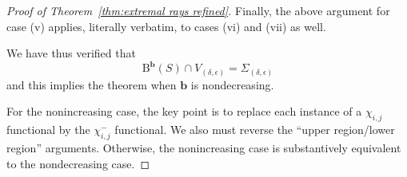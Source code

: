 \documentclass[12pt]{amsart}
\theoremstyle{definition}
\theoremstyle{remark}
\newcommand{\bb}{\mathbf{b}}
\newcommand{\BBQ}{\mathrm{B}}
\begin{document}
\begin{proof}[Proof of Theorem~\ref{thm:extremal rays refined}]
Finally, the above argument for case (v) applies, literally verbatim, to cases (vi) and (vii) as well. 

We have thus verified that
\[
\BBQ^{\bb}(S)\cap V_{(\delta,\epsilon)}=\Sigma_{(\delta,\epsilon)}
\]
and this implies the theorem when $\bb$ is nondecreasing.  

For the nonincreasing case, the key point is to replace each instance of a $\chi_{i,j}$ functional by the $\chi^{-}_{i,j}$ functional.  We also must reverse the ``upper region/lower region'' arguments.  Otherwise, the nonincreasing case is substantively equivalent to the nondecreasing case.
\end{proof}










\end{document}
